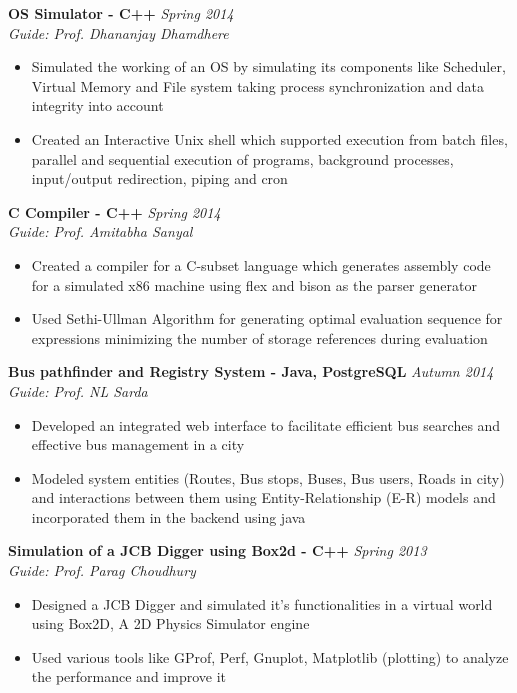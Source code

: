 \documentclass[11pt]{res}
\begin{document}
\begin{resume}
\newpage

\vspace{-10pt}
\textbf{OS Simulator - C++ } \hfill \emph{Spring 2014}\\
\textsl{Guide: Prof. Dhananjay Dhamdhere}\hfill
\begin{itemize} \itemsep -2pt
\item Simulated the working of an OS by simulating its components like Scheduler, Virtual Memory and File system taking process synchronization and data integrity into account
\item Created an Interactive Unix shell which supported execution from batch files, parallel and sequential execution of programs, background processes, input/output redirection, piping and cron 
\end{itemize}

\vspace{-10pt}
\textbf{C Compiler - C++} \hfill \emph{Spring 2014}\\
\textsl{Guide: Prof. Amitabha Sanyal}\hfill
\begin{itemize} \itemsep -2pt
\item Created a compiler for a C-subset language which generates assembly code for a simulated x86 machine using flex and bison as the parser generator
\item Used Sethi-Ullman Algorithm for generating optimal evaluation sequence for expressions minimizing the number of storage references during evaluation 
\end{itemize}

\vspace{-10pt}
\textbf{Bus pathfinder and Registry System - Java, PostgreSQL} \hfill \emph{Autumn 2014}\\
\textsl{Guide: Prof. NL Sarda}\hfill  
\begin{itemize} \itemsep -2pt
\item Developed an integrated web interface to facilitate efficient bus searches and effective bus management in a city
\item Modeled system entities (Routes, Bus stops, Buses, Bus users, Roads in city) and interactions between them using Entity-Relationship (E-R) models and incorporated them in the backend using java
\end{itemize}

\vspace{-10pt}
\textbf{Simulation of a JCB Digger using Box2d - C++ } \hfill \emph{Spring 2013}\\
\textsl{Guide: Prof. Parag Choudhury}\hfill
\begin{itemize} \itemsep -2pt
\item Designed a JCB Digger and simulated it's functionalities in a virtual world using Box2D, A 2D Physics Simulator engine 
\item Used various tools like GProf, Perf, Gnuplot, Matplotlib (plotting) to analyze the performance and improve it
\end{itemize}


\end{resume}
\end{document}
